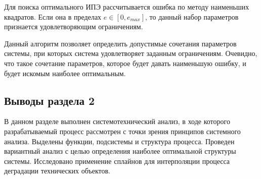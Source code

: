 Для поиска оптимального ИПЭ рассчитывается ошибка по методу наименьших квадратов. 
Если она в пределах $e \in [0,e_{max}]$, то данный набор параметров признается удовлетворяющим ограничениям.

Данный алгоритм позволяет определить допустимые сочетания параметров системы, при которых система удовлетворяет заданным ограничениям. 
Очевидно, что такое сочетание параметров, которое будет давать наименьшую ошибку, и будет искомым наиболее оптимальным.


\subsection*{Выводы раздела 2}
В данном разделе выполнен системотехнический анализ, в ходе которого разрабатываемый процесс рассмотрен с точки зрения принципов системного анализа. 
Выделены функции, подсистемы и структура процесса. 
Проведен вариантный анализ с целью определения наиболее оптимальной структуры системы. 
Исследовано применение сплайнов для интерполяции процесса деградации технических объектов.





